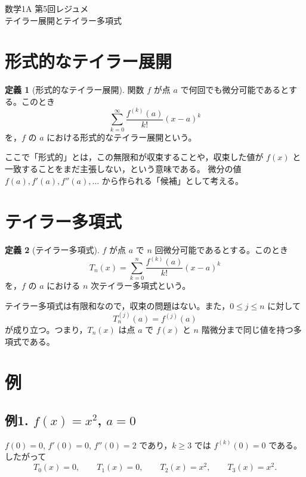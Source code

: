 \documentclass[a4paper,12pt]{jsarticle}
\theoremstyle{definition}
\newtheorem*{definition}{定義}
\begin{document}
\begin{center}
{\LARGE 数学1A 第5回レジュメ}\\[0.4em]
テイラー展開とテイラー多項式
\end{center}

\section{形式的なテイラー展開}

\begin{definition}[形式的なテイラー展開]
関数 $f$ が点 $a$ で何回でも微分可能であるとする。このとき
\[
\sum_{k=0}^{\infty}\frac{f^{(k)}(a)}{k!}(x-a)^k
\]
を，$f$ の $a$ における形式的なテイラー展開という。
\end{definition}

ここで「形式的」とは，この無限和が収束することや，収束した値が $f(x)$ と一致することをまだ主張しない，という意味である。
微分の値 $f(a),f'(a),f''(a),\dots$ から作られる「候補」として考える。

\section{テイラー多項式}

\begin{definition}[テイラー多項式]
$f$ が点 $a$ で $n$ 回微分可能であるとする。このとき
\[
T_n(x)=\sum_{k=0}^{n}\frac{f^{(k)}(a)}{k!}(x-a)^k
\]
を，$f$ の $a$ における $n$ 次テイラー多項式という。
\end{definition}

テイラー多項式は有限和なので，収束の問題はない。また，$0\leq j\leq n$ に対して
\[
T_n^{(j)}(a)=f^{(j)}(a)
\]
が成り立つ。つまり，$T_n(x)$ は点 $a$ で $f(x)$ と $n$ 階微分まで同じ値を持つ多項式である。

\section{例}

\subsection*{例1. $f(x)=x^2$, $a=0$}

$f(0)=0$, $f'(0)=0$, $f''(0)=2$ であり，$k\geq 3$ では $f^{(k)}(0)=0$ である。したがって
\[
T_0(x)=0,\qquad
T_1(x)=0,\qquad
T_2(x)=x^2,\qquad
T_3(x)=x^2.
\]
\end{document}
